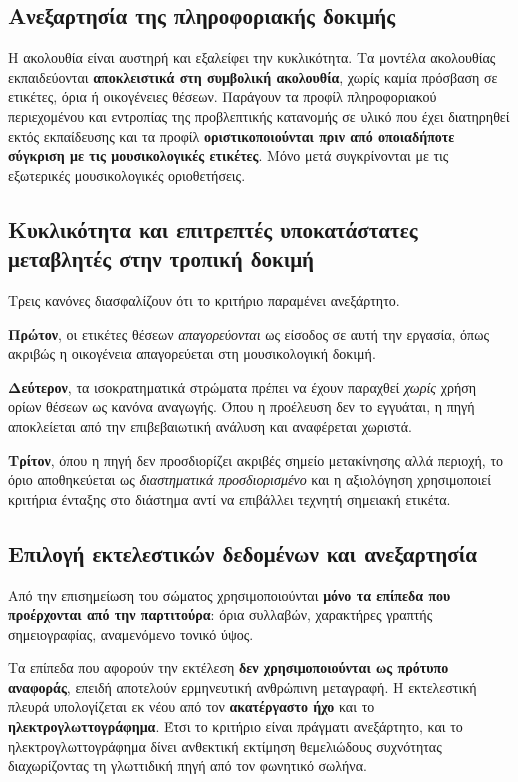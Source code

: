 \documentclass[11pt,a4paper]{article}
\begin{document}
\subsection{Ανεξαρτησία της πληροφοριακής δοκιμής}\label{app:splits-info}

Η ακολουθία είναι αυστηρή και εξαλείφει την κυκλικότητα. Τα μοντέλα ακολουθίας εκπαιδεύονται \textbf{αποκλειστικά στη συμβολική ακολουθία}, χωρίς καμία πρόσβαση σε ετικέτες, όρια ή οικογένειες θέσεων. Παράγουν τα προφίλ πληροφοριακού περιεχομένου και εντροπίας της προβλεπτικής κατανομής σε υλικό που έχει διατηρηθεί εκτός εκπαίδευσης και τα προφίλ \textbf{οριστικοποιούνται πριν από οποιαδήποτε σύγκριση με τις μουσικολογικές ετικέτες}. Μόνο μετά συγκρίνονται με τις εξωτερικές μουσικολογικές οριοθετήσεις.

\subsection{Κυκλικότητα και επιτρεπτές υποκατάστατες μεταβλητές στην τροπική δοκιμή}\label{app:splits-trop}

Τρεις κανόνες διασφαλίζουν ότι το κριτήριο παραμένει ανεξάρτητο.

\textbf{Πρώτον}, οι ετικέτες θέσεων \emph{απαγορεύονται} ως είσοδος σε αυτή την εργασία, όπως ακριβώς η οικογένεια απαγορεύεται στη μουσικολογική δοκιμή.

\textbf{Δεύτερον}, τα ισοκρατηματικά στρώματα πρέπει να έχουν παραχθεί \emph{χωρίς} χρήση ορίων θέσεων ως κανόνα αναγωγής. Όπου η προέλευση δεν το εγγυάται, η πηγή αποκλείεται από την επιβεβαιωτική ανάλυση και αναφέρεται χωριστά.

\textbf{Τρίτον}, όπου η πηγή δεν προσδιορίζει ακριβές σημείο μετακίνησης αλλά περιοχή, το όριο αποθηκεύεται ως \emph{διαστηματικά προσδιορισμένο} και η αξιολόγηση χρησιμοποιεί κριτήρια ένταξης στο διάστημα αντί να επιβάλλει τεχνητή σημειακή ετικέτα.

\subsection{Επιλογή εκτελεστικών δεδομένων και ανεξαρτησία}\label{app:splits-perf}

Από την επισημείωση του σώματος χρησιμοποιούνται \textbf{μόνο τα επίπεδα που προέρχονται από την παρτιτούρα}: όρια συλλαβών, χαρακτήρες γραπτής σημειογραφίας, αναμενόμενο τονικό ύψος.

Τα επίπεδα που αφορούν την εκτέλεση \textbf{δεν χρησιμοποιούνται ως πρότυπο αναφοράς}, επειδή αποτελούν ερμηνευτική ανθρώπινη μεταγραφή. Η εκτελεστική πλευρά υπολογίζεται εκ νέου από τον \textbf{ακατέργαστο ήχο} και το \textbf{ηλεκτρογλωττογράφημα}. Έτσι το κριτήριο είναι πράγματι ανεξάρτητο, και το ηλεκτρογλωττογράφημα δίνει ανθεκτική εκτίμηση θεμελιώδους συχνότητας διαχωρίζοντας τη γλωττιδική πηγή από τον φωνητικό σωλήνα.
\end{document}
